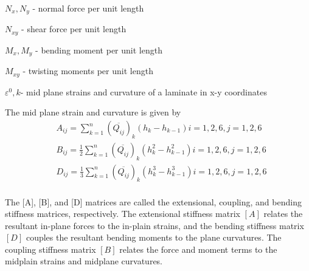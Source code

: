 $N_x,N_y $  - normal force per unit length

$N_{xy} $  - shear force per unit length

$M_x, M_y $ - bending moment per unit length

$M_{xy} $  - twisting moments per unit length

$\varepsilon^{0}, k $- mid plane strains and curvature of a laminate in x-y coordinates

The mid plane strain and curvature is given by
\begin{equation}
    \begin{split}
    &A_{ij}=\sum_{k=1}^{n}(\overline{Q_{ij}})_k(h_k-h_{k-1})  i=1,2,6, j=1,2,6\\
    &B_{ij}=\frac{1}{2}\sum_{k=1}^{n}(\overline{Q_{ij}})_k(h_k^2 - h_{k-1}^2)  i=1,2,6, j=1,2,6\\
    &D_{ij}=\frac{1}{3}\sum_{k=1}^{n}(\overline{Q_{ij}})_k(h_k^3 - h_{k-1}^3) i=1,2,6, j=1,2,6\\
    \end{split}
\end{equation}

The [A], [B], and [D] matrices are called the extensional, coupling, and bending stiffness matrices,
respectively. The extensional stiffness matrix $[A]$ relates the resultant in-plane forces to the
in-plain strains, and the bending stiffness matrix $[D]$ couples the resultant bending moments to
the plane curvatures.  The coupling stiffness matrix $[B]$ relates the force and moment terms to the
midplain strains and midplane curvatures.
